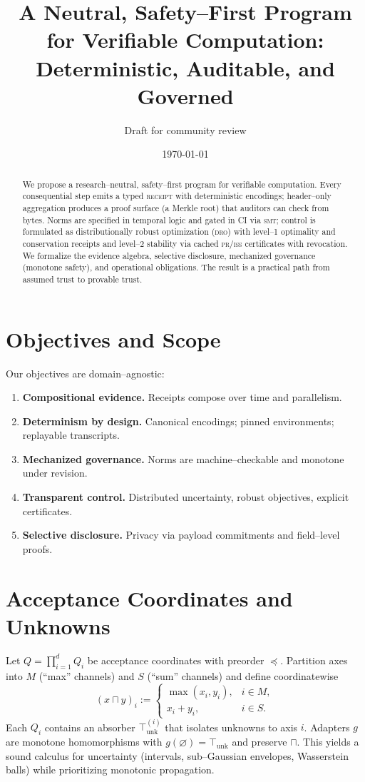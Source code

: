 \documentclass[11pt]{article}
\title{A Neutral, Safety--First Program for Verifiable Computation:\\
Deterministic, Auditable, and Governed}
\author{Draft for community review}
\date{\today}
\theoremstyle{plain}
\theoremstyle{remark}
\newcommand{\receipt}{\textsc{receipt}}
\newcommand{\smt}{\textsc{smt}}
\newcommand{\iss}{\textsc{iss}}
\newcommand{\pr}{\textsc{pr}}
\newcommand{\dro}{\textsc{dro}}
\begin{document}
\maketitle

\begin{abstract}
\noindent
We propose a research--neutral, safety--first program for verifiable computation.
Every consequential step emits a typed \receipt{} with deterministic encodings; header--only aggregation
produces a proof surface (a Merkle root) that auditors can check from bytes. Norms are specified in temporal logic and gated in CI via \smt; control is formulated as distributionally robust optimization (\dro) with level--1 optimality and conservation receipts and level--2 stability via cached \pr/\iss{} certificates with revocation. We formalize the evidence algebra, selective disclosure, mechanized governance (monotone safety), and operational obligations. The result is a practical path from assumed trust to provable trust.
\end{abstract}

\section{Objectives and Scope}
\label{sec:objectives}
Our objectives are domain--agnostic:
\begin{enumerate}[label=\textbf{O\arabic*.}]
  \item \textbf{Compositional evidence.} Receipts compose over time and parallelism.
  \item \textbf{Determinism by design.} Canonical encodings; pinned environments; replayable transcripts.
  \item \textbf{Mechanized governance.} Norms are machine--checkable and monotone under revision.
  \item \textbf{Transparent control.} Distributed uncertainty, robust objectives, explicit certificates.
  \item \textbf{Selective disclosure.} Privacy via payload commitments and field--level proofs.
\end{enumerate}

\section{Acceptance Coordinates and Unknowns}
\label{sec:acceptance}
Let $Q=\prod_{i=1}^d Q_i$ be acceptance coordinates with preorder $\preceq$. Partition axes into $M$ (``max'' channels) and $S$ (``sum'' channels) and define coordinatewise
\[
(x \sqcap y)_i :=
\begin{cases}
\max(x_i,y_i), & i\in M,\\[3pt]
x_i+y_i, & i\in S.
\end{cases}
\]
Each $Q_i$ contains an absorber $\top^{(i)}_{\text{unk}}$ that isolates unknowns to axis $i$.
Adapters $g$ are monotone homomorphisms with $g(\varnothing)=\top_{\text{unk}}$ and preserve $\sqcap$.
This yields a sound calculus for uncertainty (intervals, sub--Gaussian envelopes, Wasserstein balls) while prioritizing monotonic propagation.
\end{document}
